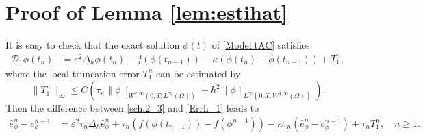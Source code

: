 \documentclass{m2an}
\newcommand{\md}{\mathcal{D}}
\begin{document}
%
%
%

\appendix

\section{Proof of Lemma \ref{lem:estihat}}\label{App:B}
\setcounter{equation}{0}
\renewcommand\theequation{A.\arabic{equation}}
It is easy to check that the exact solution $ \phi( t ) $ of \eqref{Model:tAC} satisfies
\begin{equation}\label{Errh_1}
	\begin{aligned}
		\md_{1} \phi( t_n ) & = \varepsilon^2 \Delta_h \phi( t_n ) + f( \phi( t_{n-1} ) ) - \kappa ( \phi( t_n ) - \phi( t_{n-1} ) ) + T_{1}^n,
	\end{aligned}
\end{equation}
where the local truncation error $ T_{1}^n $ can be estimated by
\begin{equation}\label{Trun_11}
	\| T_{1}^{n} \|_{\infty} \leq C \left( \tau_{n} \| \phi \|_{ W^{2,\infty}(0,T;L^{\infty}(\Omega)) } + h^2 \| \phi \|_{ L^{\infty}(0,T;W^{4,\infty}(\Omega)) } \right).
\end{equation}
Then the difference between \eqref{sch:2_3} and \eqref{Errh_1} leads to
\begin{equation}\label{Errh_2}
	\begin{aligned}
		\hat{e}_{\phi}^{n} - e_{\phi}^{n-1} & = \varepsilon^2 \tau_{n} \Delta_h \hat{e}_{\phi}^{n} + \tau_{n} ( f( \phi( t_{n-1} ) ) - f( \phi^{n-1} ) ) - \kappa \tau_{n} ( \hat{e}_{\phi}^{n} - e_{\phi}^{n-1} ) + \tau_{n} T_{1}^n,  \quad n \geq 1.
	\end{aligned}
\end{equation}
\end{document}
